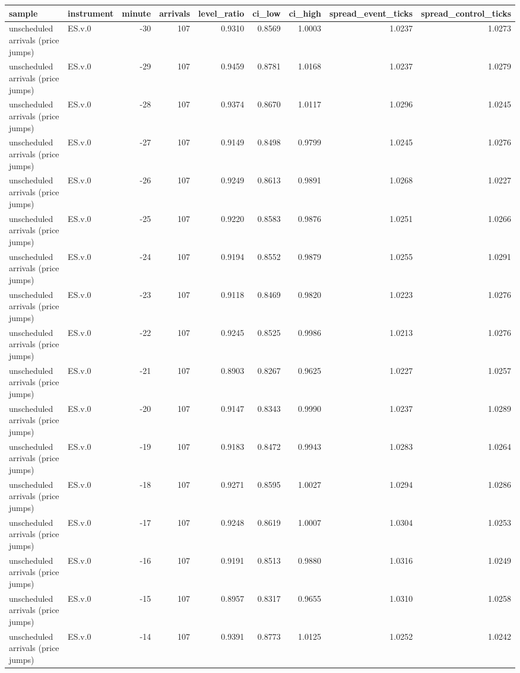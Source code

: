\begin{tabular}{llrrrrrrr}
\toprule
sample & instrument & minute & arrivals & level_ratio & ci_low & ci_high & spread_event_ticks & spread_control_ticks \\
\midrule
unscheduled arrivals (price jumps) & ES.v.0 & -30 & 107 & 0.9310 & 0.8569 & 1.0003 & 1.0237 & 1.0273 \\
unscheduled arrivals (price jumps) & ES.v.0 & -29 & 107 & 0.9459 & 0.8781 & 1.0168 & 1.0237 & 1.0279 \\
unscheduled arrivals (price jumps) & ES.v.0 & -28 & 107 & 0.9374 & 0.8670 & 1.0117 & 1.0296 & 1.0245 \\
unscheduled arrivals (price jumps) & ES.v.0 & -27 & 107 & 0.9149 & 0.8498 & 0.9799 & 1.0245 & 1.0276 \\
unscheduled arrivals (price jumps) & ES.v.0 & -26 & 107 & 0.9249 & 0.8613 & 0.9891 & 1.0268 & 1.0227 \\
unscheduled arrivals (price jumps) & ES.v.0 & -25 & 107 & 0.9220 & 0.8583 & 0.9876 & 1.0251 & 1.0266 \\
unscheduled arrivals (price jumps) & ES.v.0 & -24 & 107 & 0.9194 & 0.8552 & 0.9879 & 1.0255 & 1.0291 \\
unscheduled arrivals (price jumps) & ES.v.0 & -23 & 107 & 0.9118 & 0.8469 & 0.9820 & 1.0223 & 1.0276 \\
unscheduled arrivals (price jumps) & ES.v.0 & -22 & 107 & 0.9245 & 0.8525 & 0.9986 & 1.0213 & 1.0276 \\
unscheduled arrivals (price jumps) & ES.v.0 & -21 & 107 & 0.8903 & 0.8267 & 0.9625 & 1.0227 & 1.0257 \\
unscheduled arrivals (price jumps) & ES.v.0 & -20 & 107 & 0.9147 & 0.8343 & 0.9990 & 1.0237 & 1.0289 \\
unscheduled arrivals (price jumps) & ES.v.0 & -19 & 107 & 0.9183 & 0.8472 & 0.9943 & 1.0283 & 1.0264 \\
unscheduled arrivals (price jumps) & ES.v.0 & -18 & 107 & 0.9271 & 0.8595 & 1.0027 & 1.0294 & 1.0286 \\
unscheduled arrivals (price jumps) & ES.v.0 & -17 & 107 & 0.9248 & 0.8619 & 1.0007 & 1.0304 & 1.0253 \\
unscheduled arrivals (price jumps) & ES.v.0 & -16 & 107 & 0.9191 & 0.8513 & 0.9880 & 1.0316 & 1.0249 \\
unscheduled arrivals (price jumps) & ES.v.0 & -15 & 107 & 0.8957 & 0.8317 & 0.9655 & 1.0310 & 1.0258 \\
unscheduled arrivals (price jumps) & ES.v.0 & -14 & 107 & 0.9391 & 0.8773 & 1.0125 & 1.0252 & 1.0242 \\

\end{tabular}
